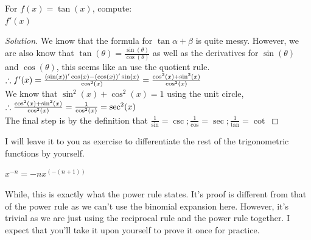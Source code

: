 \begin{example}
    For $f(x)=\tan(x)$, compute:\\
    $f'(x)$
\end{example}
\begin{proof}
    [Solution]
    We know that the formula for $\tan{\alpha+\beta}$ is quite messy. However, we are also know that $\tan(\theta) = \frac{\sin(\theta)}{\cos(\theta)}$ as well as the derivatives for $\sin(\theta)$ and $\cos(\theta)$, this seems like an use the quotient rule.\\
    $\therefore f'(x)=\frac{(\sin(x))'\cos(x)-(\cos(x))'\sin(x)}{\cos^2(x)}\\
    =\frac{\cos^2(x)+\sin^2(x)}{\cos^2(x)}$\\
    We know that $\sin^2(x)+\cos^2(x)=1$ using the unit circle,\\
    $\therefore \frac{\cos^2(x)+\sin^2(x)}{\cos^2(x)}\\
    = \frac{1}{\cos^2(x)}\\
    = \sec^2(x)$\\
    The final step is by the definition that $\frac{1}{\sin}=\csc; \frac{1}{\cos}=\sec; \frac{1}{\tan}=\cot$
\end{proof}
I will leave it to you as exercise to differentiate the rest of the trigonometric functions by yourself.\\
\begin{theorem}
    $x^{-n}=-nx^(-(n+1))$
\end{theorem}
While, this is exactly what the power rule states. It's proof is different from that of the power rule as we can't use the binomial expansion here. However, it's trivial as we are just using the reciprocal rule and the power rule together. I expect that you'll take it upon yourself to prove it once for practice.
